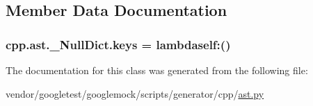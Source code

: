 \subsection{Member Data Documentation}
\subsubsection[{\texorpdfstring{keys}{keys}}]{\setlength{\rightskip}{0pt plus 5cm}cpp.\+ast.\+\_\+\+Null\+Dict.\+keys = lambdaself\+:()\hspace{0.3cm}{\ttfamily [static]}}\hypertarget{classcpp_1_1ast_1_1__NullDict_abb0b7884aa59bede0a8503dffcd1733f}{}\label{classcpp_1_1ast_1_1__NullDict_abb0b7884aa59bede0a8503dffcd1733f}


The documentation for this class was generated from the following file\+:\begin{DoxyCompactItemize}
\item 
vendor/googletest/googlemock/scripts/generator/cpp/\hyperlink{ast_8py}{ast.\+py}\end{DoxyCompactItemize}
